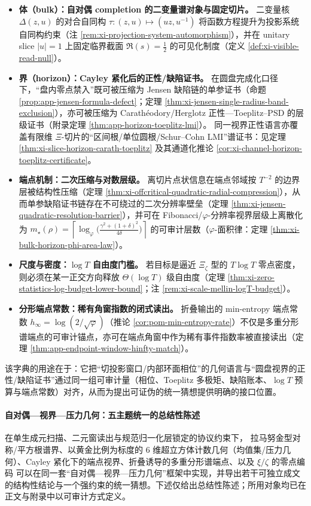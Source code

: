 \begin{itemize}
  \item \textbf{体（bulk）：自对偶 completion 的二变量谱对象与固定切片。}
  二变量核 \(\Delta(z,u)\) 的对合自同构 \(\tau:(z,u)\mapsto(uz,u^{-1})\) 将函数方程提升为投影系统自同构约束（注 \ref{rem:xi-projection-system-automorphism}），并在 unitary slice \(|u|=1\) 上固定临界截面 \(\Re(s)=\tfrac12\) 的可见化制度（定义 \ref{def:xi-visible-read-null}）。
  \item \textbf{界（horizon）：Cayley 紧化后的正性/缺陷证书。}
  在圆盘完成化口径下，“盘内零点禁入”既可被压缩为 Jensen 缺陷链的单参证书（命题 \ref{prop:app-jensen-formula-defect}；定理 \ref{thm:xi-jensen-single-radius-band-exclusion}），亦可被压缩为 Carath\'eodory/Herglotz 正性—Toeplitz--PSD 的层级证书（附录定理 \ref{thm:app-horizon-toeplitz-lmi}）。
  同一视界正性语言亦覆盖有限维 \(\Xi\)-切片的“区间根/单位圆根/Schur--Cohn LMI”谱证书：见定理 \ref{thm:xi-slice-horizon-carath-toeplitz} 及其通道化推论 \ref{cor:xi-channel-horizon-toeplitz-certificate}。
  \item \textbf{端点机制：二次压缩与对数层级。}
  离切片点状信息在端点邻域按 \(T^{-2}\) 的边界层被结构性压缩（定理 \ref{thm:xi-offcritical-quadratic-radial-compression}），从而单参缺陷证书链存在不可绕过的二次分辨率壁垒（定理 \ref{thm:xi-jensen-quadratic-resolution-barrier}），并可在 Fibonacci/\(\varphi\)-分辨率视界层级上离散化为
  \(m_\star(\rho)=\left\lceil \log_{\varphi}\!\bigl(\frac{\gamma^2+(1+\delta)^2}{4\delta}\bigr)\right\rceil\)
  的可审计层数（\(\varphi\)-面积律：定理 \ref{thm:xi-bulk-horizon-phi-area-law}）。
  \item \textbf{尺度与密度：\texorpdfstring{$\log T$}{log T} 自由度门槛。}
  若目标是逼近 \(\Xi_\zeta\) 型的 \(T\log T\) 零点密度，则必须在某一正交方向释放 \(\Theta(\log T)\) 级自由度（定理 \ref{thm:xi-zero-statistics-log-budget-lower-bound}；注 \ref{rem:xi-scale-mellin-logT-budget}）。
  \item \textbf{分形端点常数：稀有角窗指数的闭式读出。}
  折叠输出的 min-entropy 端点常数 \(h_\infty=\log(2/\sqrt\varphi)\)（推论 \ref{cor:pom-min-entropy-rate}）不仅是多重分形谱端点的可审计锚点，亦可在端点角窗中作为稀有事件指数率被直接读出（定理 \ref{thm:app-endpoint-window-hinfty-match}）。
\end{itemize}
该字典的用途在于：它把“切投影窗口/内部环面相位”的几何语言与“圆盘视界的正性/缺陷证书”通过同一组可审计量（相位、Toeplitz 多极矩、缺陷账本、\(\log T\) 预算与端点常数）对齐，从而为提出可证伪的统一猜想提供明确的接口位置。

\paragraph{自对偶—视界—压力几何：五主题统一的总结性陈述}
在单生成元扫描、二元窗读出与规范归一化层锁定的协议约束下，
拉马努金型对称/平方根谱界、以黄金比例为标度的 \(6\) 维超立方体计数几何（均值集/压力几何）、Cayley 紧化下的端点视界、折叠诱导的多重分形谱端点、以及 \(\xi/\zeta\) 的零点编码
可以在同一套“自对偶—视界—压力几何”框架中实现，并导出若干可独立成文的结构性结论与一个强约束的统一猜想。下述仅给出总结性陈述；所用对象均已在正文与附录中以可审计方式定义。

